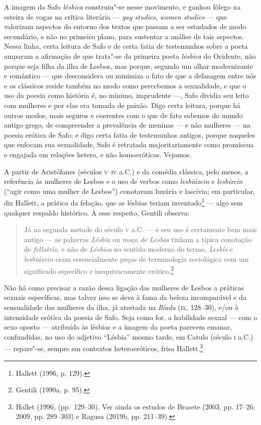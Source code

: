 A imagem da Safo \textit{lésbica} construiu"-se nesse movimento, e ganhou fôlego
na esteira de vogas na crítica literária --- \textit{gay studies}, \textit{women
studies} --- que valorizam aspectos do entorno dos textos que passam a ser
estudados de modo secundário, e não no primeiro plano, para sustentar a análise
de tais aspectos. Nessa linha, certa leitura de Safo e de certa fatia de
testemunhos sobre a poeta amparam a afirmação de que trata"-se da primeira poeta
\textit{lésbica} do Ocidente, não porque seja filha da ilha de Lesbos, mas
porque, segundo um olhar modernizante e romântico --- que
desconsidera ou minimiza o fato de que a defasagem entre nós e os clássicos
reside também no modo como percebemos a sexualidade, e que o uso da poesia como
história é, no mínimo, imprudente ---, Safo dividia seu leito com mulheres e por
elas era tomada de paixão. Digo certa leitura, porque há outros modos, mais
seguros e coerentes com o que de fato sabemos do mundo antigo grego, de
compreender a prevalência de meninas --- e não mulheres ---  na poesia erótica de Safo; e digo
certa fatia de testemunhos antigos, porque naqueles que enfocam sua
sexualidade, Safo é retratada majoritariamente como promíscua e engajada em relações hetero, e não homoeróticas. Vejamos. 

A partir de Aristófanes (séculos \textsc{v}--\textsc{iv} a.C.) e da comédia clássica, pelo menos, a
referência às mulheres de Lesbos e o uso de verbos como \textit{lesbiázein} e
\textit{lesbízein} (“agir como uma mulher de Lesbos”) conotavam luxúria e
lascívia; em particular, diz Hallett, a prática da
felação, que as lésbias teriam inventado\footnote{ Hallett (1996, p. 129).} --- algo sem qualquer respaldo
histórico. A esse respeito, Gentili observa: 

\begin{quote}
Já na segunda metade do século \textsc{v} a.C. --- e seu uso é certamente bem mais antigo
--- as palavras \textit{Lésbia} ou \textit{moça de Lesbos} tinham a típica
conotação de \textit{fellatrix}, e não de \textit{Lésbica} no sentido moderno
do termo. \textit{Lesbís} e \textit{lesbiázein} eram essencialmente peças de
terminologia sociológica com um significado específico e inequivocamente
erótico.\footnote{ Gentili (1990a, p. 95).}
\end{quote}

Não há como precisar a razão dessa ligação das mulheres de Lesbos a práticas
sexuais específicas, mas talvez isso se deva à fama da beleza incomparável e da
sensualidade das mulheres da ilha, já atestada na \textit{Ilíada} (\textsc{ix}, 128--30),
e/ou à intensidade erótica da poesia de Safo. Seja como for, a habilidade
sexual --- com o sexo oposto --- atribuída às lésbias e a imagem da poeta parecem
emanar, confundidas, no uso do adjetivo “Lésbia” mesmo tarde, em Catulo
(século \textsc{i} a.C.) --- repare"-se, sempre em contextos heteroeróticos, frisa Hallett.\footnote{ Hallet 
(1996, (pp.~129--30). Ver ainda os estudos de Brasete (2003, pp. 17--26; 2009, pp. 289--303) e Ragusa (2019b, pp. 211--39).} 

